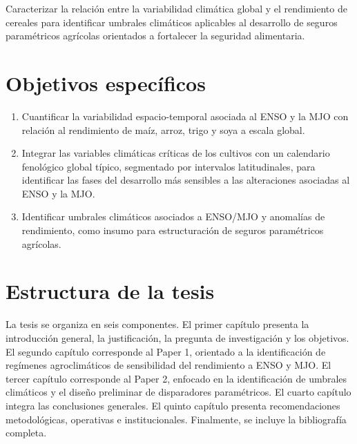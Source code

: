 Caracterizar la relación entre la variabilidad climática global y el rendimiento de cereales para identificar umbrales climáticos aplicables al desarrollo de seguros paramétricos agrícolas orientados a fortalecer la seguridad alimentaria.

\section{Objetivos específicos}

\begin{enumerate}
  \item Cuantificar la variabilidad espacio-temporal asociada al ENSO y la MJO con relación al rendimiento de maíz, arroz, trigo y soya a escala global.
  \item Integrar las variables climáticas críticas de los cultivos con un calendario fenológico global típico, segmentado por intervalos latitudinales, para identificar las fases del desarrollo más sensibles a las alteraciones asociadas al ENSO y la MJO.
  \item Identificar umbrales climáticos asociados a ENSO/MJO y anomalías de rendimiento, como insumo para estructuración de seguros paramétricos agrícolas.
\end{enumerate}

\section{Estructura de la tesis}

La tesis se organiza en seis componentes. El primer capítulo presenta la introducción general, la justificación, la pregunta de investigación y los objetivos. El segundo capítulo corresponde al Paper 1, orientado a la identificación de regímenes agroclimáticos de sensibilidad del rendimiento a ENSO y MJO. El tercer capítulo corresponde al Paper 2, enfocado en la identificación de umbrales climáticos y el diseño preliminar de disparadores paramétricos. El cuarto capítulo integra las conclusiones generales. El quinto capítulo presenta recomendaciones metodológicas, operativas e institucionales. Finalmente, se incluye la bibliografía completa.
